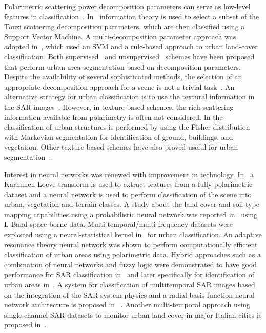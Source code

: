 Polarimetric scattering power decomposition parameters can serve as low-level features in classification~\cite{bhattacharya2015adaptive}. In~\cite{bhattacharya2012polarimetric} information theory is used to select a subset of the Touzi scattering decomposition parameters, which are then classified using a Support Vector Machine. A multi-decomposition parameter approach was adopted in~\cite{niu2013multi}, which used an SVM and a rule-based approach to urban land-cover classification. 
Both supervised~\cite{da2008land} and unsupervised~\cite{lee2004unsupervised} schemes have been proposed that perform urban area segmentation based on decomposition parameters. 
Despite the availability of several sophisticated methods, the selection of an appropriate decomposition approach for a scene is not a trivial task~\cite{chen2014modeling}. An alternative strategy for urban classification is to use the textural information  in the SAR images~\cite{1344157, 1183703}. However, in texture based schemes, the rich scattering information available from polarimetry is often not considered. 
In the classification of urban structures is performed by using the Fisher distribution with Markovian segmentation for identification of ground, buildings, and vegetation. Other texture based schemes have also proved useful for urban segmentation~\cite{1183703}. 

Interest in neural networks was renewed with improvement in technology. In~\cite{214928} a Karhunen-Loeve transform is used to extract features from a fully polarimetric dataset and a neural network is used to perform classification of the scene into urban, vegetation and terrain classes.   A study about the land-cover and soil type mapping capabilities using a probabilistic neural network was reported in~\cite{antropov2014land}  using L-Band space-borne data. Multi-temporal/multi-frequency datasets were exploited using a neural-statistical kernel in~\cite{1237401} for urban classification. An adaptive resonance theory neural network   was shown to perform computationally efficient classification of urban areas using polarimetric data. Hybrid approaches such as a combination of neural networks and fuzzy logic were demonstrated to have good performance for SAR classification in~\cite{655339} and later specifically for identification of urban areas in~\cite{gamba2003increased}. A system for classification of multitemporal SAR images based on the integration of the SAR system physics and a radial basis function neural network architecture is proposed in ~\cite{4623140}. Another multi-temporal approach using single-channel SAR datasets to monitor urban land cover in major Italian cities is proposed in~\cite{doi:10.1080/01431160118746}. 

